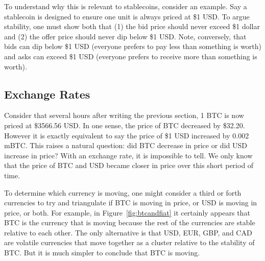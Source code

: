 To understand why this is relevant to stablecoins, consider an example. Say a stablecoin is designed to ensure one unit is always priced at \$1 USD. To argue stability, one must show both that (1) the bid price should never exceed \$1 dollar and (2) the offer price should never dip below \$1 USD. Note, conversely, that bids can dip below \$1 USD (everyone prefers to pay less than something is worth) and asks can exceed \$1 USD (everyone prefers to receive more than something is worth).

\subsection{Exchange Rates}

Consider that several hours after writing the previous section, 1 BTC is now priced at \$3566.56 USD. In one sense, the price of BTC decreased by \$32.20. However it is exactly equivalent to say the price of \$1 USD increased by 0.002 mBTC. This raises a natural question: did BTC decrease in price or did USD increase in price? With an exchange rate, it is impossible to tell. We only know that the price of BTC and USD became closer in price over this short period of time.

To determine which currency is moving, one might consider a third or forth currencies to try and triangulate if BTC is moving in price, or USD is moving in price, or both. For example, in Figure~\ref{fig:btcandfiat} it certainly appears that BTC is the currency that is moving because the rest of the currencies are stable relative to each other. The only alternative is that USD, EUR, GBP, and CAD are volatile currencies that move together as a cluster relative to the stability of BTC. But it is much simpler to conclude that BTC is moving.

